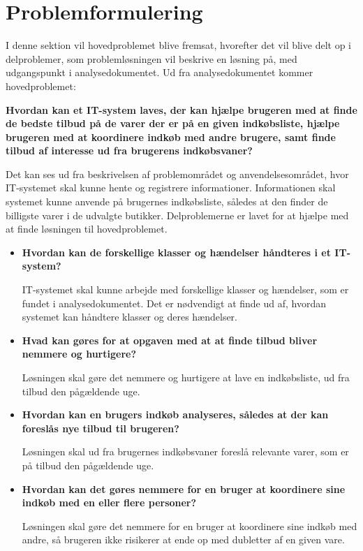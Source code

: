 \section{Problemformulering}
\label{sec:problem}
I denne sektion vil hovedproblemet blive fremsat, hvorefter det vil blive delt op i delproblemer, som problemløsningen vil beskrive en løsning på, med udgangspunkt i analysedokumentet.
Ud fra analysedokumentet kommer hovedproblemet:

\textbf{Hvordan kan et IT-system laves, der kan hjælpe brugeren med at finde de bedste tilbud på de varer der er på en given indkøbsliste, hjælpe brugeren med at koordinere indkøb med andre brugere, samt finde tilbud af interesse ud fra brugerens indkøbsvaner?}

Det kan ses ud fra beskrivelsen af problemområdet og anvendelsesområdet, hvor IT-systemet skal kunne hente og registrere informationer. Informationen skal systemet kunne anvende på brugernes indkøbsliste, således at den finder de billigste varer i de udvalgte butikker.
Delproblemerne er lavet for at hjælpe med at finde løsningen til hovedproblemet.
\begin{itemize}

\item\textbf{Hvordan kan de forskellige klasser og hændelser håndteres i et IT-system?}

IT-systemet skal kunne arbejde med forskellige klasser og hændelser, som er fundet i analysedokumentet. Det er nødvendigt at finde ud af, hvordan systemet kan håndtere klasser og deres hændelser. 

\item\textbf{Hvad kan gøres for at opgaven med at at finde tilbud bliver nemmere og hurtigere?}

Løsningen skal gøre det nemmere og hurtigere at lave en indkøbsliste, ud fra tilbud den pågældende uge.

\item\textbf{Hvordan kan en brugers indkøb analyseres, således at der kan foreslås nye tilbud til brugeren?}

Løsningen skal ud fra brugernes indkøbsvaner foreslå relevante varer, som er på tilbud den pågældende uge.

\item\textbf{Hvordan kan det gøres nemmere for en bruger at koordinere sine indkøb med en eller flere personer?}

Løsningen skal gøre det nemmere for en bruger at koordinere sine indkøb med andre, så brugeren ikke risikerer at ende op med dubletter af en given vare.

\end{itemize}
